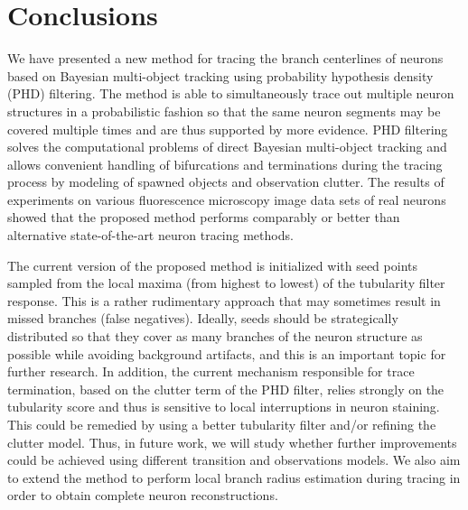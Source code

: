 \section{Conclusions}
\label{sec:conclusions}
We have presented a new method for tracing the branch centerlines of neurons based on Bayesian multi-object tracking using probability hypothesis density (PHD) filtering. The method is able to simultaneously trace out multiple neuron structures in a probabilistic fashion so that the same neuron segments may be covered multiple times and are thus supported by more evidence. PHD filtering solves the computational problems of direct Bayesian multi-object tracking and allows convenient handling of bifurcations and terminations during the tracing process by modeling of spawned objects and observation clutter. The results of experiments on various fluorescence microscopy image data sets of real neurons showed that the proposed method performs comparably or better than alternative state-of-the-art neuron tracing methods.

The current version of the proposed method is initialized with seed points sampled from the local maxima (from highest to lowest) of the tubularity filter response. This is a rather rudimentary approach that may sometimes result in missed branches (false negatives). Ideally, seeds should be strategically distributed so that they cover as many branches of the neuron structure as possible while avoiding background artifacts, and this is an important topic for further research. In addition, the current mechanism responsible for trace termination, based on the clutter term of the PHD filter, relies strongly on the tubularity score and thus is sensitive to local interruptions in neuron staining. This could be remedied by using a better tubularity filter and/or refining the clutter model. Thus, in future work, we will study whether further improvements could be achieved using different transition and observations models. We also aim to extend the method to perform local branch radius estimation during tracing in order to obtain complete neuron reconstructions.

%
%
%
%

